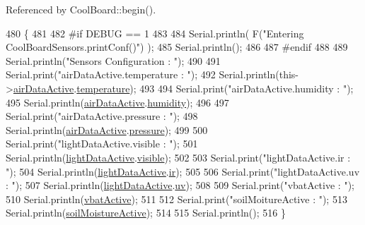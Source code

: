 Referenced by Cool\+Board\+::begin().


\begin{DoxyCode}
480 \{
481 
482 \textcolor{preprocessor}{#if DEBUG == 1}
483 
484     Serial.println( F(\textcolor{stringliteral}{"Entering CoolBoardSensors.printConf()"}) );
485     Serial.println();
486 
487 \textcolor{preprocessor}{#endif}
488 
489     Serial.println(\textcolor{stringliteral}{"Sensors Configuration : "});
490     
491     Serial.print(\textcolor{stringliteral}{"airDataActive.temperature : "});
492     Serial.println(this->\hyperlink{classCoolBoardSensors_abff8dfeccb2f7689847bb64d5f1cd31e}{airDataActive}.\hyperlink{structCoolBoardSensors_1_1airActive_a9a6633c426b0508e30ebc1832ec6d745}{temperature});
493 
494     Serial.print(\textcolor{stringliteral}{"airDataActive.humidity : "});
495     Serial.println(\hyperlink{classCoolBoardSensors_abff8dfeccb2f7689847bb64d5f1cd31e}{airDataActive}.\hyperlink{structCoolBoardSensors_1_1airActive_ae5740445054b27415e22f450576accb7}{humidity});
496 
497     Serial.print(\textcolor{stringliteral}{"airDataActive.pressure : "});
498     Serial.println(\hyperlink{classCoolBoardSensors_abff8dfeccb2f7689847bb64d5f1cd31e}{airDataActive}.\hyperlink{structCoolBoardSensors_1_1airActive_ab200826a70d1dc9945f5efb6b9c732ed}{pressure});
499 
500     Serial.print(\textcolor{stringliteral}{"lightDataActive.visible : "});
501     Serial.println(\hyperlink{classCoolBoardSensors_ac4deb1cf41bac8b91c780c92fab00ba4}{lightDataActive}.\hyperlink{structCoolBoardSensors_1_1lightActive_abcbba296b6a95e67c0cd2555d9dd50c7}{visible});
502 
503     Serial.print(\textcolor{stringliteral}{"lightDataActive.ir : "});
504     Serial.println(\hyperlink{classCoolBoardSensors_ac4deb1cf41bac8b91c780c92fab00ba4}{lightDataActive}.\hyperlink{structCoolBoardSensors_1_1lightActive_a67700895349b95ceb263f1a6da756315}{ir});
505 
506     Serial.print(\textcolor{stringliteral}{"lightDataActive.uv : "});
507     Serial.println(\hyperlink{classCoolBoardSensors_ac4deb1cf41bac8b91c780c92fab00ba4}{lightDataActive}.\hyperlink{structCoolBoardSensors_1_1lightActive_a949a7aaf5166d981de8fe0fd93da20d6}{uv});
508     
509     Serial.print(\textcolor{stringliteral}{"vbatActive : "});
510     Serial.println(\hyperlink{classCoolBoardSensors_af5039ad760b0ff0aa7eee16c55e81702}{vbatActive});
511 
512     Serial.print(\textcolor{stringliteral}{"soilMoitureActive : "});
513     Serial.println(\hyperlink{classCoolBoardSensors_a31983eecc0f9cd000e1f912206ea4dc8}{soilMoistureActive});
514 
515     Serial.println();
516 \}
\end{DoxyCode}
